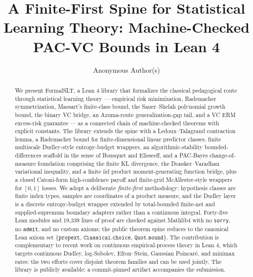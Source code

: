 \documentclass[sigplan,anonymous,review,screen]{acmart}
\begin{document}
\title{A Finite-First Spine for Statistical Learning Theory: Machine-Checked PAC-VC Bounds in Lean 4}

\author{Anonymous Author(s)}

\renewcommand{\shortauthors}{Anonymous}

\begin{abstract}
We present FormalSLT, a Lean 4 library that formalizes the classical
pedagogical route through statistical learning theory --- empirical risk
minimization, Rademacher symmetrization, Massart's finite-class bound,
the Sauer--Shelah polynomial growth bound, the binary VC bridge, an
Azuma-route generalization-gap tail, and a VC ERM excess-risk
guarantee --- as a connected chain of machine-checked theorems with
explicit constants. The library extends the spine with a Ledoux--Talagrand
contraction lemma, a Rademacher bound for finite-dimensional linear
predictor classes, finite multiscale Dudley-style entropy-budget
wrappers, an algorithmic-stability bounded-differences scaffold in the
sense of Bousquet and Elisseeff, and a PAC-Bayes change-of-measure
foundation comprising the finite KL divergence, the Donsker--Varadhan
variational inequality, and a finite iid product moment-generating
function bridge, plus a closed Catoni-form high-confidence payoff and
finite-grid McAllester-style wrappers for $[0,1]$ losses. We adopt a
deliberate \emph{finite-first} methodology:
hypothesis classes are finite index types, samples are coordinates of a
product measure, and the Dudley layer is a discrete entropy-budget
wrapper extended by total-bounded finite-net and supplied-supremum boundary
adapters rather than a continuous integral. Forty-five Lean modules and
19,339 lines of proof are checked against
Mathlib4 with no \texttt{sorry}, no \texttt{admit}, and no custom axioms;
the public theorem spine reduces to the canonical Lean axiom set
$\{\texttt{propext},\,\texttt{Classical.choice},\,\texttt{Quot.sound}\}$.
The contribution is complementary to recent work on continuous
empirical-process theory in Lean 4, which targets continuous Dudley,
log-Sobolev, Efron--Stein, Gaussian Poincar\'e, and minimax rates: the
two efforts cover disjoint theorem families and can be used jointly.
The library is publicly available; a commit-pinned artifact accompanies
the submission.
\end{abstract}

\end{document}
